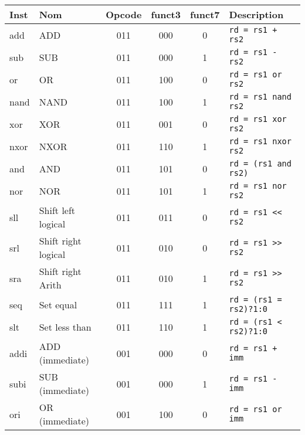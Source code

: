 \documentclass[a4paper]{article}
\begin{document}
    \begin{tabular}{|l|l|c|c|c|l|}
        \hline
        Inst  & Nom                             & Opcode & funct3 & funct7 & Description                   \\
        \hline
        add   & ADD                             & 011    & 000    & 0      & \texttt{rd = rs1 + rs2}       \\
        sub   & SUB                             & 011    & 000    & 1      & \texttt{rd = rs1 - rs2}       \\
        or    & OR                              & 011    & 100    & 0      & \texttt{rd = rs1 or rs2}      \\
        nand  & NAND                            & 011    & 100    & 1      & \texttt{rd = rs1 nand rs2}    \\
        xor   & XOR                             & 011    & 001    & 0      & \texttt{rd = rs1 xor rs2}     \\
        nxor  & NXOR                            & 011    & 110    & 1      & \texttt{rd = rs1 nxor rs2}    \\
        and   & AND                             & 011    & 101    & 0      & \texttt{rd = (rs1 and rs2)}   \\
        nor   & NOR                             & 011    & 101    & 1      & \texttt{rd = rs1 nor rs2}     \\
        sll   & Shift left logical              & 011    & 011    & 0      & \texttt{rd = rs1 << rs2}      \\
        srl   & Shift right logical             & 011    & 010    & 0      & \texttt{rd = rs1 >> rs2}      \\
        sra   & Shift right Arith               & 011    & 010    & 1      & \texttt{rd = rs1 >> rs2}      \\
        seq   & Set equal                       & 011    & 111    & 1      & \texttt{rd = (rs1 = rs2)?1:0} \\
        slt   & Set less than                   & 011    & 110    & 1      & \texttt{rd = (rs1 < rs2)?1:0} \\
        \hline
        addi  & ADD (immediate)                 & 001    & 000    & 0      & \texttt{rd = rs1 + imm}       \\
        subi  & SUB (immediate)                 & 001    & 000    & 1      & \texttt{rd = rs1 - imm}       \\
        ori   & OR (immediate)                  & 001    & 100    & 0      & \texttt{rd = rs1 or imm}      \\

\end{tabular}
\end{document}
